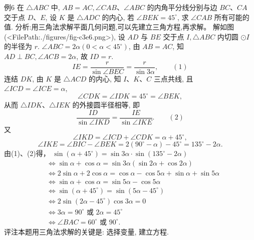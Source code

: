 例6 在 $\triangle A B C$ 中, $A B=A C, \angle C A B 、 \angle A B C$ 的内角平分线分别与边 $B C 、 C A$ 交于点 $D 、 E$, 设 $K$ 是 $\triangle A D C$ 的内心, 若 $\angle B E K=45^{\circ}$, 求 $\angle C A B$ 所有可能的值.
分析:用三角法求解平面几何问题,可以先建立三角方程,再求解。
解如图 (<FilePath:./figures/fig-c3e6.png>), 设 $A D$ 与 $B E$ 交于点 $I, \triangle A B C$ 内切圆 $\odot I$ 的半径为 $r$.
$\angle A B C=2 \alpha\left(0<\alpha<45^{\circ}\right)$, 由 $A B=A C$, 知 $A D \perp B C, \angle A C B=2 \alpha$, 故 $I D=r$.
$$
I E=\frac{r}{\sin \angle B E C}=\frac{r}{\sin 3 \alpha}, \quad\quad (1)
$$
连结 $D K$, 由 $K$ 是 $\triangle A C D$ 的内心, 知 $I 、 K 、 C$ 三点共线, 且 $\angle I C D= \angle I C E=\alpha$,
$$
\angle C D K=\angle I D K=45^{\circ}=\angle B E K,
$$
从而 $\triangle I D K 、 \triangle I E K$ 的外接圆半径相等, 即
$$
\frac{I D}{\sin \angle I K D}=\frac{I E}{\sin \angle I K E} . \quad\quad (2)
$$
又
$$
\angle I K D=\angle I C D+\angle C D K=\alpha+45^{\circ},
$$
$$
\angle I K E=\angle B I C-\angle B E K=2\left(90^{\circ}-\alpha\right)-45^{\circ}=135^{\circ}-2 \alpha .
$$
由(1)、(2)得， $\sin \left(\alpha+45^{\circ}\right)=\sin 3 \alpha \cdot \sin \left(135^{\circ}-2 \alpha\right)$
$$
\begin{aligned}
& \Leftrightarrow \sin \alpha+\cos \alpha=\sin 3 \alpha(\sin 2 \alpha+\cos 2 \alpha) \\
& \Leftrightarrow 2 \sin \alpha+2 \cos \alpha=\cos \alpha-\cos 5 \alpha+\sin \alpha+\sin 5 \alpha \\
& \Leftrightarrow \sin \alpha+\cos \alpha=\sin 5 \alpha-\cos 5 \alpha \\
& \Leftrightarrow \sin \left(\alpha+45^{\circ}\right)=\sin \left(5 \alpha-45^{\circ}\right) \\
& \Leftrightarrow 2 \sin \left(2 \alpha-45^{\circ}\right) \cos 3 \alpha=0 \\
& \Leftrightarrow 3 \alpha=90^{\circ} \text { 或 } 2 \alpha=45^{\circ} \\
& \Leftrightarrow \angle B A C=60^{\circ} \text { 或 } 90^{\circ} .
\end{aligned}
$$
评注本题用三角法求解的关键是: 选择变量, 建立方程.



